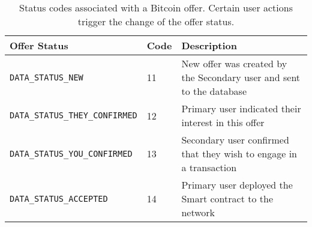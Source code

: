 \begin{table}[ht]
    \centering
    \begin{tabularx}{\textwidth}{|l|l|X|}
        \hline
        \textbf{Offer Status}&\textbf{Code}&\textbf{Description}\\
        \hline
        \hline
        \texttt{DATA\_STATUS\_NEW}&11&New offer was created by the Secondary user and sent to the database\\
        \hline
        \texttt{DATA\_STATUS\_THEY\_CONFIRMED}&12&Primary user indicated their interest in this offer\\
        \hline
        \texttt{DATA\_STATUS\_YOU\_CONFIRMED}&13&Secondary user confirmed that they wish to engage in a transaction\\
        \hline
        \texttt{DATA\_STATUS\_ACCEPTED }&14&Primary user deployed the Smart contract to the network\\
        \hline
    \end{tabularx}
    \caption{Status codes associated with a Bitcoin offer. Certain user actions trigger the change of the offer status.}
    \label{tab:offer-status}
\end{table}